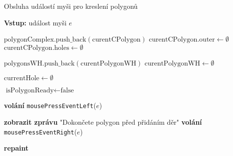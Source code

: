 \begin{algorithm}
    \caption{Obsluha událostí myši pro kreslení polygonů}
    \begin{algorithmic}[1]
        \STATE \textbf{Vstup:} událost myši $e$
        

                \STATE $\text{polygonComplex}.\text{push\_back}(\text{curentCPolygon})$
                \STATE $\text{curentCPolygon}.\text{outer} \gets \emptyset$
                \STATE $\text{curentCPolygon}.\text{holes} \gets \emptyset$
                
                \STATE $\text{polygonsWH}.\text{push\_back}(\text{curentPolygonWH})$
                \STATE $\text{curentPolygonWH} \gets \emptyset$
            \ENDIF
            
            \STATE $\text{currentHole} \gets \emptyset$
            
            \STATE $\text{isPolygonReady} \gets \text{false}$
            
            \STATE \textbf{volání} \texttt{mousePressEventLeft}($e$)
        \ENDIF

                \STATE \textbf{zobrazit zprávu} "Dokončete polygon před přidáním děr"
            \ELSE
                \STATE \textbf{volání} \texttt{mousePressEventRight}($e$)
            \ENDIF
        \ENDIF

        \STATE \textbf{repaint}
    \end{algorithmic}
\end{algorithm}

